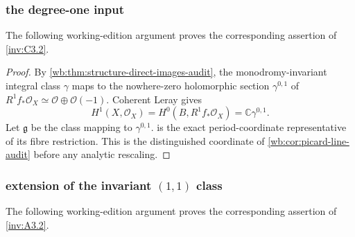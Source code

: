 \subsubsection{the degree-one input}\label{inv:wbproof:lem:bcpr-degree-one-input}
The following working-edition argument proves the corresponding assertion of \cref{inv:C3.2}.


\begin{proof}
By \cref{wb:thm:structure-direct-images-audit}, the monodromy-invariant
integral class $\gamma$ maps to the nowhere-zero holomorphic section
$\gamma^{0,1}$ of
$R^1f_*\mathcal O_X\simeq\mathcal O\oplus\mathcal O(-1)$.  Coherent
Leray gives
\[
 H^1(X,\mathcal O_X)=H^0(B,R^1f_*\mathcal O_X)
 =\mathbb C\gamma^{0,1}.
\]
Let $\mathfrak g$ be the class mapping to $\gamma^{0,1}$.
 is the exact period-coordinate
representative of its fibre restriction.  This is the distinguished
coordinate of \cref{wb:cor:picard-line-audit} before any analytic rescaling.
\end{proof}

\subsubsection{extension of the invariant $(1,1)$ class}\label{inv:wbproof:lem:bcpr-eta-extension}
The following working-edition argument proves the corresponding assertion of \cref{inv:A3.2}.


